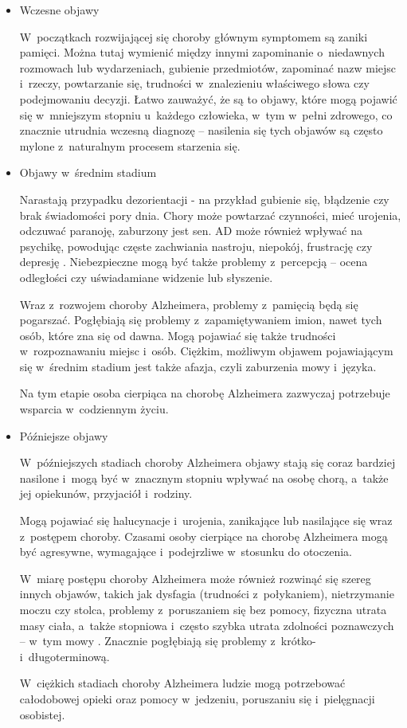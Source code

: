 \begin{itemize}

  \item Wczesne objawy

        W~początkach rozwijającej się choroby głównym symptomem są zaniki pamięci.
        Można tutaj wymienić między innymi zapominanie o~niedawnych rozmowach lub wydarzeniach, gubienie przedmiotów, zapominać nazw miejsc i~rzeczy, powtarzanie się, trudności w~znalezieniu właściwego słowa czy podejmowaniu decyzji.
        Łatwo zauważyć, że są to objawy, które mogą pojawić się w~mniejszym stopniu u~każdego człowieka, w~tym w~pełni zdrowego, co znacznie utrudnia wczesną diagnozę -- nasilenia się tych objawów są często mylone z~naturalnym procesem starzenia się.

  \item Objawy w~średnim stadium

        Narastają przypadku dezorientacji - na przykład gubienie się, błądzenie czy brak świadomości pory dnia.
        Chory może powtarzać czynności, mieć urojenia, odczuwać paranoję, zaburzony jest sen.
        AD może również wpływać na psychikę, powodując częste zachwiania nastroju, niepokój, frustrację czy depresję \cite{li2014behavioral}.
        Niebezpieczne mogą być także problemy z~percepcją -- ocena odległości czy uświadamiane widzenie lub słyszenie.

        Wraz z~rozwojem choroby Alzheimera, problemy z~pamięcią będą się pogarszać.
        Pogłębiają się problemy z~zapamiętywaniem imion, nawet tych osób, które zna się od dawna.
        Mogą pojawiać się także trudności w~rozpoznawaniu miejsc i~osób.
        Ciężkim, możliwym objawem pojawiającym się w~średnim stadium jest także afazja, czyli zaburzenia mowy i~języka.

        Na tym etapie osoba cierpiąca na chorobę Alzheimera zazwyczaj potrzebuje wsparcia w~codziennym życiu.

  \item Późniejsze objawy

        W~późniejszych stadiach choroby Alzheimera objawy stają się coraz bardziej nasilone i~mogą być w~znacznym stopniu wpływać na osobę chorą, a~także jej opiekunów, przyjaciół i~rodziny.

        Mogą pojawiać się halucynacje i~urojenia, zanikające lub nasilające się wraz z~postępem choroby.
        Czasami osoby cierpiące na chorobę Alzheimera mogą być agresywne, wymagające i~podejrzliwe w~stosunku do otoczenia.

        W~miarę postępu choroby Alzheimera może również rozwinąć się szereg innych objawów, takich jak dysfagia (trudności z~połykaniem), nietrzymanie moczu czy stolca, problemy z~poruszaniem się bez pomocy, fizyczna utrata masy ciała, a~także stopniowa i~często szybka utrata zdolności poznawczych -- w~tym mowy \cite{joe2019cognitive}.
        Znacznie pogłębiają się problemy z~krótko- i~długoterminową.

        W~ciężkich stadiach choroby Alzheimera ludzie mogą potrzebować całodobowej opieki oraz pomocy w~jedzeniu, poruszaniu się i~pielęgnacji osobistej.

\end{itemize}

